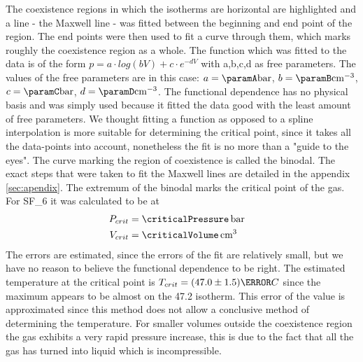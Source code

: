 \documentclass[a4paper,10pt,twocolumn]{article}
\begin{document}
    The coexistence regions in which the isotherms are horizontal are highlighted and a line - the Maxwell line - was fitted between the beginning and end point of the region.
    The end points were then used to fit a curve through them, which marks roughly the coexistence region as a whole.
    The function which was fitted to the data is of the form $p = a \cdot log(bV) + c\cdot e^{-dV}$ with a,b,c,d as free parameters.
    The values of the free parameters are in this case: $a = \paramA \text{bar} $, $b = \paramB \text{cm}^{-3} $, $c = \paramC \text{bar}$, $d = \paramD \text{cm}^{-3}$.
    The functional dependence has no physical basis and was simply used because it fitted the data good with the least amount of free parameters.
    We thought fitting a function as opposed to a spline interpolation is more suitable for determining the critical point, since it takes all the 
    data-points into account, nonetheless the fit is no more than a "guide to the eyes".
    The curve marking the region of coexistence is called the binodal.
    The exact steps that were taken to fit the Maxwell lines are detailed in the appendix \ref{sec:apendix}. 
    The extremum of the binodal marks the critical point of the gas. 
    For SF_6\) it was calculated to be at
    \begin{align}
        P_{crit} &= \criticalPressure \,\text{bar}
        \endline
        V_{crit} &= \criticalVolume \,\text{cm}^3
        \end{align}
    The errors are estimated, since the errors of the fit are relatively small, but we have no reason to believe the functional dependence to be right.
    The estimated temperature at the critical point is $T_{crit} = (47.0 \pm 1.5)\degree C $ since the maximum appears to be almost on the 47.2\degree\) isotherm.
    This error of the value is approximated since this method does not allow a conclusive method of determining the temperature.
    For smaller volumes outside the coexistence region the gas exhibits a very rapid pressure increase, this is due to the fact that all the gas has turned into liquid which is incompressible.
\end{document}
